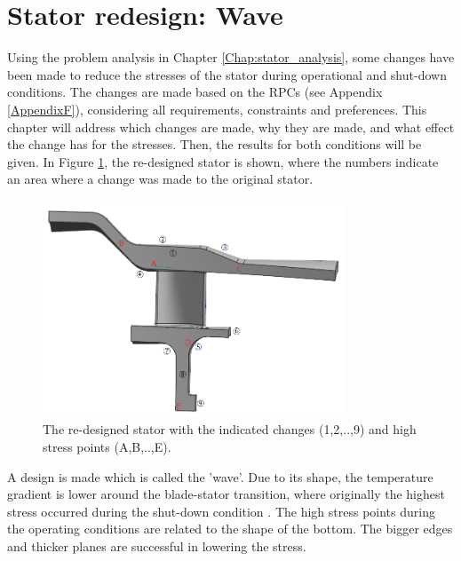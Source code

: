 \section{Stator redesign: Wave}
\label{Chap:stator_redesign}
Using the problem analysis in Chapter \ref{Chap:stator_analysis}, some changes have been made to reduce the stresses of the stator during operational and shut-down conditions. The changes are made based on the RPCs (see Appendix \ref{AppendixF}), considering all requirements, constraints and preferences. This chapter will address which changes are made, why they are made, and what effect the change has for the stresses. Then, the results for both conditions will be given. In Figure \ref{fig:final_stator}, the re-designed stator is shown, where the numbers indicate an area where a change was made to the original stator.
\begin{figure}[H]
\centering
\includegraphics[width=0.8\textwidth]{Figures/final_stator.png}
\caption{The re-designed stator with the indicated changes (1,2,..,9) and high stress points (A,B,..,E).}
\label{fig:final_stator}
\end{figure}
A design is made which is called the 'wave'. Due to its shape, the temperature gradient is lower around the blade-stator transition, where originally the highest stress occurred during the shut-down condition \cite{temperaturepressure}. The high stress points during the operating conditions are related to the shape of the bottom. The bigger edges and thicker planes are successful in lowering the stress. 

